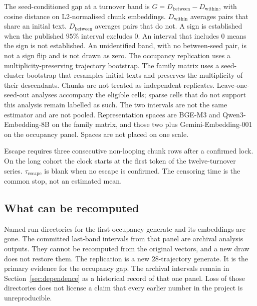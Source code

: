 \documentclass[10pt]{article}
\begin{document}
The seed-conditioned gap at a turnover band is
$G = D_{\mathrm{between}} - D_{\mathrm{within}}$,
with cosine distance on L2-normalised chunk embeddings.
$D_{\mathrm{within}}$ averages pairs that share an initial text.
$D_{\mathrm{between}}$ averages pairs that do not.
A sign is established when the published $95\%$ interval excludes $0$.
An interval that includes $0$ means the sign is not established.
An unidentified band, with no between-seed pair, is not a sign flip and
is not drawn as zero.
The occupancy replication uses a multiplicity-preserving trajectory
bootstrap. %
The family matrix uses a seed-cluster bootstrap that resamples initial
texts and preserves the multiplicity of their descendants.
Chunks are not treated as independent replicates.
Leave-one-seed-out analyses accompany the eligible cells; sparse cells
that do not support this analysis remain labelled as such. %
The two intervals are not the same estimator and are not pooled.
Representation spaces are BGE-M3 and Qwen3-Embedding-8B on the family
matrix, and those two plus Gemini-Embedding-001 on the occupancy panel.
Spaces are not placed on one scale.

Escape requires three consecutive non-looping chunk rows after a
confirmed lock. %
On the long cohort the clock starts at the first token of the
twelve-turnover series.
$\tau_{\mathrm{escape}}$ is blank when no escape is confirmed.
The censoring time is the common stop, not an estimated mean.

\subsection{What can be recomputed}
\label{sec:archival}

Named run directories for the first occupancy generate and its
embeddings are gone. %
The committed last-band intervals from that panel are archival analysis
outputs.
They cannot be recomputed from the original vectors, and a new draw
does not restore them.
The replication is a new $28$-trajectory generate. %
It is the primary evidence for the occupancy gap.
The archival intervals remain in Section~\ref{sec:dependence} as a
historical record of that one panel.
Loss of those directories does not license a claim that every earlier
number in the project is unreproducible.
\end{document}
